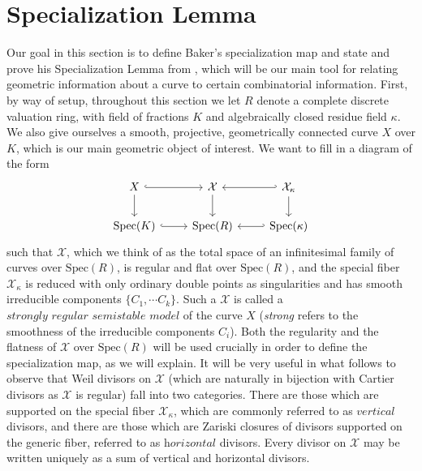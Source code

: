 \documentclass{article}
\begin{document}
\section{Specialization Lemma}
Our goal in this section is to define Baker's specialization map and state and prove his Specialization Lemma from \cite{baker08}, which will be our main tool for relating geometric information about a curve to certain combinatorial information. First, by way of setup, throughout this section we let $R$ denote a complete discrete valuation ring,  with field of fractions $K$ and algebraically closed residue field $\kappa$. We also give ourselves a smooth, projective, geometrically connected curve $X$ over $K$, which is our main geometric object of interest. We want to fill in a diagram of the form
\[
\begin{tikzcd}
X \arrow[d] \arrow[r, hook]    & \mathcal{X} \arrow[d] & \mathcal{X}_{\kappa} \arrow[d] \arrow[l, hook'] \\
\text{Spec}(K) \arrow[r, hook] & \text{Spec}(R)        & \text{Spec}(\kappa) \arrow[l, hook']   \end{tikzcd}
\]
such that $\mathcal{X}$, which we think of as the total space of an infinitesimal family of curves over $\text{Spec}(R)$, is regular and flat over $\text{Spec}(R)$, and the special fiber $\mathcal{X}_{\kappa}$ is reduced with only ordinary double points as singularities and has smooth irreducible components $\{C_1, \cdots C_k\}$. Such a $\mathcal{X}$ is called a $\textit{strongly regular semistable model}$ of the curve $X$ (\textit{strong} refers to the smoothness of the irreducible components $C_i$). Both the regularity and the flatness of $\mathcal{X}$ over $\text{Spec}(R)$ will be used crucially in order to define the specialization map, as we will explain. 
\newline
\newline
It will be very useful in what follows to observe that Weil divisors on $\mathcal{X}$ (which are naturally in bijection with Cartier divisors as $\mathcal{X}$ is regular) fall into two categories. There are those which are supported on the special fiber $\mathcal{X}_{\kappa}$, which are commonly referred to as $\textit{vertical}$ divisors, and there are those which are Zariski closures of divisors supported on the generic fiber, referred to as $\textit{horizontal}$ divisors. Every divisor on $\mathcal{X}$ may be written uniquely as a sum of vertical and horizontal divisors.  
\newline
\newline
\end{document}
